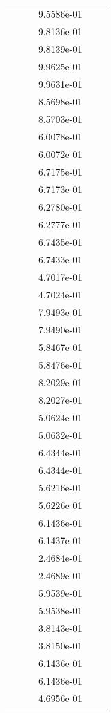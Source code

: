 \begin{xltabular}{\textwidth}{r|rS[table-format=1.3e+2]S[table-format=1.4e+2]S[table-format=1.4e+2]S[table-format=-1.5]}
&  &  & 9.5586e-01 & & \\
&  &  & 9.8136e-01 & & \\
&  &  & 9.8139e-01 & & \\
&  &  & 9.9625e-01 & & \\
&  &  & 9.9631e-01 & & \\
&  &  & 8.5698e-01 & & \\
&  &  & 8.5703e-01 & & \\
&  &  & 6.0078e-01 & & \\
&  &  & 6.0072e-01 & & \\
&  &  & 6.7175e-01 & & \\
&  &  & 6.7173e-01 & & \\
&  &  & 6.2780e-01 & & \\
&  &  & 6.2777e-01 & & \\
&  &  & 6.7435e-01 & & \\
&  &  & 6.7433e-01 & & \\
&  &  & 4.7017e-01 & & \\
&  &  & 4.7024e-01 & & \\
&  &  & 7.9493e-01 & & \\
&  &  & 7.9490e-01 & & \\
&  &  & 5.8467e-01 & & \\
&  &  & 5.8476e-01 & & \\
&  &  & 8.2029e-01 & & \\
&  &  & 8.2027e-01 & & \\
&  &  & 5.0624e-01 & & \\
&  &  & 5.0632e-01 & & \\
&  &  & 6.4344e-01 & & \\
&  &  & 6.4344e-01 & & \\
&  &  & 5.6216e-01 & & \\
&  &  & 5.6226e-01 & & \\
&  &  & 6.1436e-01 & & \\
&  &  & 6.1437e-01 & & \\
&  &  & 2.4684e-01 & & \\
&  &  & 2.4689e-01 & & \\
&  &  & 5.9539e-01 & & \\
&  &  & 5.9538e-01 & & \\
&  &  & 3.8143e-01 & & \\
&  &  & 3.8150e-01 & & \\
&  &  & 6.1436e-01 & & \\
&  &  & 6.1436e-01 & & \\
&  &  & 4.6956e-01 & & \\

\end{xltabular}

